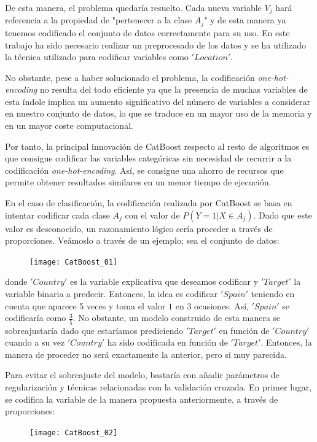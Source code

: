 \documentclass[12pt,twoside]{article}
\begin{document}
De esta manera, el problema quedaría resuelto. Cada nueva variable $V_j$ hará referencia a la propiedad de "pertenecer a la clase $A_j$" y de esta manera ya tenemos codificado el conjunto de datos correctamente para su uso. En este trabajo ha sido necesario realizar un preprocesado de los datos y se ha utilizado la técnica utilizado para codificar variables como $'Location'$.

No obstante, pese a haber solucionado el problema, la codificación \textit{one-hot-encoding} no resulta del todo eficiente ya que la presencia de muchas variables de esta índole implica un aumento significativo del número de variables a considerar en nuestro conjunto de datos, lo que se traduce en un mayor uso de la memoria y en un mayor coste computacional.

Por tanto, la principal innovación de CatBoost respecto al resto de algoritmos es que consigue codificar las variables categóricas sin necesidad de recurrir a la codificación \textit{one-hot-encoding}. Así, se consigue una ahorro de recursos que permite obtener resultados similares en un menor tiempo de ejecución.

En el caso de clasificación, la codificación realizada por CatBoost se basa en intentar codificar cada clase $A_j$ con el valor de $P(Y = 1 | X \in A_j)$. Dado que este valor es desconocido, un razonamiento lógico sería proceder a través de proporciones.  Veámoslo a través de un ejemplo; sea el conjunto de datos:
\begin{figure}[h]
\centering
\texttt{[image: CatBoost\_01]}
\end{figure}

\noindent
donde $'Country'$ es la variable explicativa que deseamos codificar y $'Target'$ la variable binaria a predecir. Entonces, la idea es codificar $'Spain'$ teniendo en cuenta que aparece 5 veces y toma el valor $1$ en 3 ocasiones. Así, $'Spain'$ se codificaría como $\frac{3}{5}$. No obstante, un modelo construido de esta manera se sobreajustaría dado que estaríamos prediciendo $'Target'$ en función de $'Country'$ cuando a su vez $'Country'$ ha sido codificada en función de $'Target'$. Entonces, la manera de proceder no será exactamente la anterior, pero sí muy parecida.

Para evitar el sobreajuste del modelo, bastaría con añadir parámetros de regularización y técnicas relacionadas con la validación cruzada. En primer lugar, se codifica la variable de la manera propuesta anteriormente, a través de proporciones:
\begin{figure}[h]
\centering
\texttt{[image: CatBoost\_02]}
\end{figure}
\end{document}
